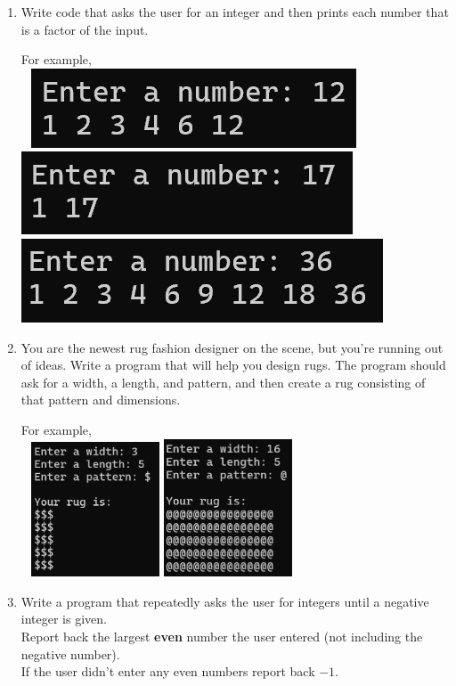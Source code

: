 \documentclass{article}
\begin{document}
\begin{enumerate}
	\item 
		Write code that asks the user for an integer and then prints each number that is a 
		factor of the input.
	
		For example, \\ \ \hfill
		\includegraphics[height = .35in]{./imgs/factors1.PNG} \hfill  
		\includegraphics[height = .35in]{./imgs/factors2.PNG} \hfill  
		\includegraphics[height = .35in]{./imgs/factors3.PNG} \hfill \


	\item 
		You are the newest rug fashion designer on the scene, but you're running out of ideas. 
		Write a program that will help you design rugs.  The program should ask for a width, 
		a length, and pattern, and then create a rug consisting of that pattern and dimensions.

		For example, \\ \ \hfill
		\includegraphics[width = 1.5in]{./imgs/rug1.PNG} \hfill  
		\includegraphics[width = 1.5in]{./imgs/rug2.PNG} \hfill \


	\item 
		Write a program that repeatedly asks the user for integers until a negative integer is 
		given.\\  Report back the largest \textbf{even} number the user entered 
		(not including the negative number).  \\
		If the user didn't enter any even numbers report back $-1$.


\end{enumerate}
\end{document}
